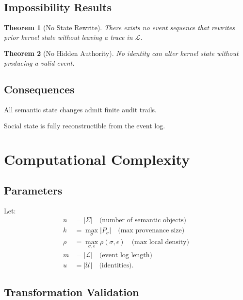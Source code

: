 \documentclass[11pt]{article}
\newtheorem{theorem}{Theorem}
\begin{document}
\subsection{Impossibility Results}

\begin{theorem}[No State Rewrite]
There exists no event sequence that rewrites prior kernel state without leaving a trace in
$\mathcal{L}$.
\end{theorem}

\begin{theorem}[No Hidden Authority]
No identity can alter kernel state without producing a valid event.
\end{theorem}

\subsection{Consequences}

\begin{corollary}[Auditability]
All semantic state changes admit finite audit trails.
\end{corollary}

\begin{corollary}
Social state is fully reconstructible from the event log.
\end{corollary}

\section{Computational Complexity}

\subsection{Parameters}

Let:
\begin{align*}
n &= |\Sigma| \quad \text{(number of semantic objects)} \\
k &= \max_{\sigma} |P_\sigma| \quad \text{(max provenance size)} \\
\rho &= \max_{\sigma,\epsilon} \rho(\sigma,\epsilon) \quad \text{(max local density)} \\
m &= |\mathcal{L}| \quad \text{(event log length)} \\
u &= |\mathcal{U}| \quad \text{(identities)}.
\end{align*}

\subsection{Transformation Validation}
\end{document}
